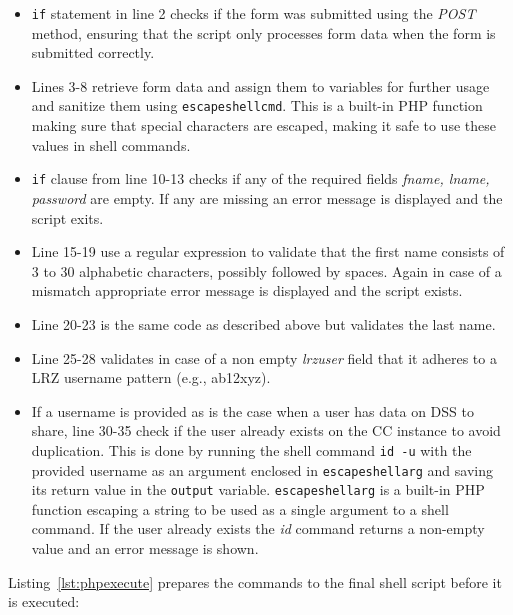 \begin{itemize}
    \item \texttt{if} statement in line 2 checks if the form was submitted using
    the \textit{POST} method, ensuring that the script only processes form data
    when the form is submitted correctly.
    \item Lines 3-8 retrieve form data and assign them to variables for further
    usage and sanitize them using \texttt{escapeshellcmd}. This is a built-in
    PHP function making sure that special characters are escaped, making it safe
    to use these values in shell commands.
    \item \texttt{if} clause from line 10-13 checks if any of the required
    fields \textit{fname, lname, password} are empty. If any are missing an
    error message is displayed and the script exits.
    \item Line 15-19 use a regular expression to validate that the first name
    consists of 3 to 30 alphabetic characters, possibly followed by spaces.
    Again in case of a mismatch appropriate error message is displayed and the
    script exists.
    \item Line 20-23 is the same code as described above but validates the last
    name.
    \item Line 25-28 validates in case of a non empty \textit{lrzuser} field
    that it adheres to a LRZ username pattern (e.g., ab12xyz).
    \item If a username is provided as is the case when a user has data on DSS
    to share, line 30-35 check if the user already exists on the CC instance to
    avoid duplication. This is done by running the shell command \texttt{id -u}
    with the provided username as an argument enclosed in
    \texttt{escapeshellarg} and saving its return value in the \texttt{output}
    variable. \texttt{escapeshellarg} is a built-in PHP function escaping a
    string to be used as a single argument to a shell command. If the user
    already exists the \textit{id} command returns a non-empty value and an
    error message is shown.
\end{itemize}



Listing~\ref{lst:phpexecute} prepares the commands to the final shell script
before it is executed:

